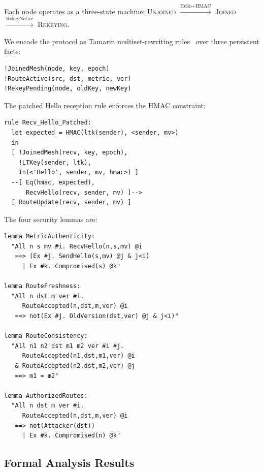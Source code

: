 \documentclass[10pt,journal,compsoc]{IEEEtran}
\begin{document}
Each node operates as a three-state machine:
\textsc{Unjoined} $\xrightarrow{\text{Hello+HMAC}}$ \textsc{Joined}
$\xrightarrow{\text{RekeyNotice}}$ \textsc{Rekeying}.

We encode the protocol as Tamarin multiset-rewriting rules~\cite{basin2025-tamarin-book,linker2026-tamarin-optimization}
over three persistent facts:
\begin{lstlisting}
!JoinedMesh(node, key, epoch)
!RouteActive(src, dst, metric, ver)
!RekeyPending(node, oldKey, newKey)
\end{lstlisting}

The patched Hello reception rule enforces the HMAC constraint:
\begin{lstlisting}[caption={Tamarin rule: patched Hello receive (simplified)}]
rule Recv_Hello_Patched:
  let expected = HMAC(ltk(sender), <sender, mv>)
  in
  [ !JoinedMesh(recv, key, epoch),
    !LTKey(sender, ltk),
    In(<'Hello', sender, mv, hmac>) ]
  --[ Eq(hmac, expected),
      RecvHello(recv, sender, mv) ]-->
  [ RouteUpdate(recv, sender, mv) ]
\end{lstlisting}

The four security lemmas are:
\begin{lstlisting}[caption={Tamarin lemmas for G1--G4}]
lemma MetricAuthenticity:
  "All n s mv #i. RecvHello(n,s,mv) @i
   ==> (Ex #j. SendHello(s,mv) @j & j<i)
     | Ex #k. Compromised(s) @k"

lemma RouteFreshness:
  "All n dst m ver #i.
     RouteAccepted(n,dst,m,ver) @i
   ==> not(Ex #j. OldVersion(dst,ver) @j & j<i)"

lemma RouteConsistency:
  "All n1 n2 dst m1 m2 ver #i #j.
     RouteAccepted(n1,dst,m1,ver) @i
   & RouteAccepted(n2,dst,m2,ver) @j
   ==> m1 = m2"

lemma AuthorizedRoutes:
  "All n dst m ver #i.
     RouteAccepted(n,dst,m,ver) @i
   ==> not(Attacker(dst))
     | Ex #k. Compromised(n) @k"
\end{lstlisting}

\subsection{Formal Analysis Results}
\end{document}

